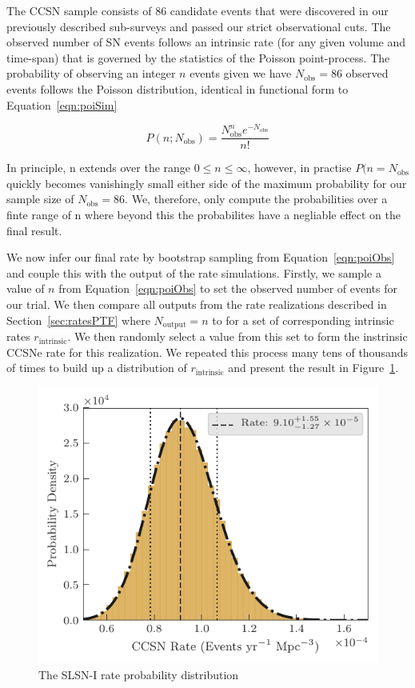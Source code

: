 \documentclass[a4paper,fleqn,usenatbib]{mnras}
\begin{document}
The CCSN sample consists of 86 candidate events that were discovered in our previously described sub-surveys and passed our strict observational cuts. The observed number of SN events follows an intrinsic rate (for any given volume and time-span) that is governed by the statistics of the Poisson point-process. The probability of observing an integer $n$ events given we have $N_\mathrm{obs}=86$ observed events follows the Poisson distribution, identical in functional form to Equation~\ref{eqn:poiSim} 

\begin{equation}
    \label{eqn:poiObs}
    P(n; N_\mathrm{obs})=\frac{N_\mathrm{obs}^{n} e^{-N_\mathrm{obs}}}{n!}
\end{equation}

In principle, n extends over the range $0 \le n \le \infty$, however, in practise $P(n=N_\mathrm{obs}$ quickly becomes vanishingly small either side of the maximum probability for our sample size of $N_\mathrm{obs}=86$. We, therefore, only compute the probabilities over a finte range of n where beyond this the probabilites have a negliable effect on the final result.

We now infer our final rate by bootstrap sampling from Equation~\ref{eqn:poiObs} and couple this with the output of the rate simulations. Firstly, we sample a value of $n$ from Equation~\ref{eqn:poiObs} to set the observed number of events for our trial. We then compare all outputs from the rate realizations described in Section~\ref{sec:ratesPTF} where $N_\mathrm{output} =  n$ to for a set of corresponding intrinsic rates $r_\mathrm{intrinsic}$. We then randomly select a value from this set to form the instrinsic CCSNe rate for this realization. We repeated this process many tens of thousands of times to build up a distribution of $r_\mathrm{intrinsic}$ and present the result in Figure~\ref{fig:ccRateDist}.

\begin{figure}
	\includegraphics[width=\linewidth]{./allCC_Rate.pdf}
    \caption{The SLSN-I rate probability distribution}
    \label{fig:ccRateDist}
\end{figure}
\end{document}
